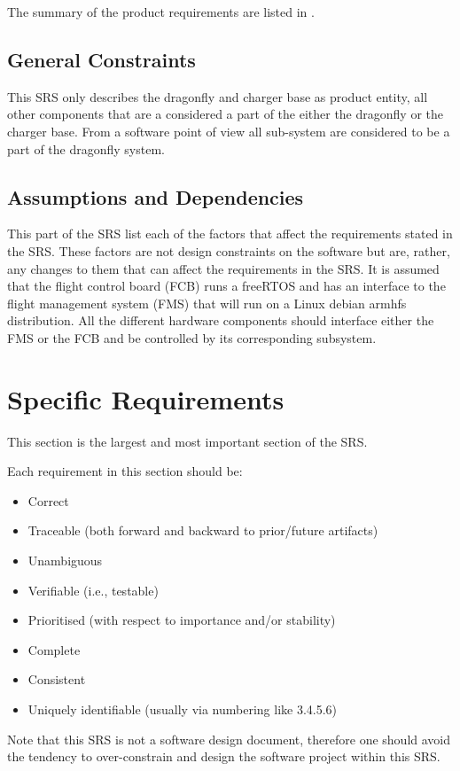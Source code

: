 \documentclass[a4paper]{article}
\begin{document}
The summary of the product requirements are listed in \cite{Dragonfly-PRS}.


\subsection{General Constraints}

This SRS only describes the dragonfly and charger base as product entity, all other components that are a considered  a part of the either the dragonfly or the charger base.
From a software point of view all sub-system are considered to be a part of the dragonfly system.

\subsection{Assumptions and Dependencies}

This part of the SRS list each of the factors that affect the requirements stated in the SRS. These factors are not design constraints on the software but are, rather, any changes to them that can affect the requirements in the SRS.
It is assumed that the flight control board (FCB) runs a freeRTOS and has an interface to the flight management system (FMS) that will run on a Linux debian armhfs distribution. All the different hardware components should interface either the FMS or the FCB and be controlled by its corresponding subsystem.

\section{Specific Requirements}

This section is the largest and most important section of the SRS.

Each requirement in this section should be:
\begin{itemize}
\item	Correct
\item	Traceable (both forward and backward to prior/future artifacts)
\item	Unambiguous
\item	Verifiable (i.e., testable)
\item	Prioritised (with respect to importance and/or stability)
\item	Complete
\item	Consistent
\item	Uniquely identifiable (usually via numbering like 3.4.5.6)
\end{itemize}
Note that this SRS is not a software design document, therefore one should avoid the tendency to over-constrain and design the software project within this SRS.
\end{document}
